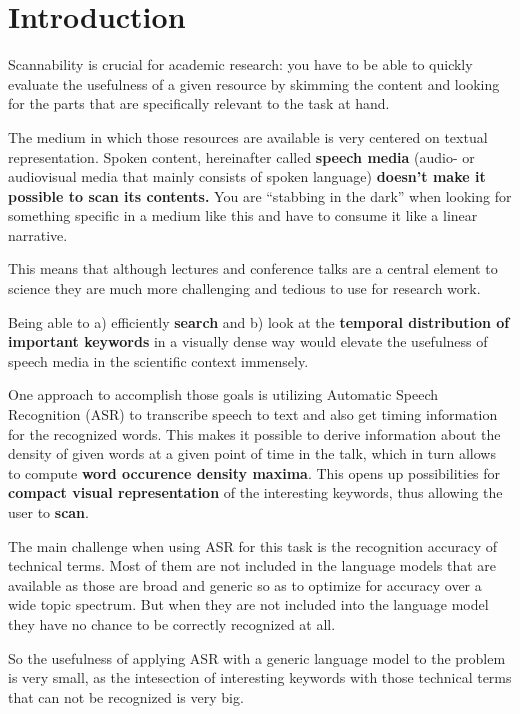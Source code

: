 \section{Introduction}\label{introduction}

Scannability is crucial for academic research: you have to be able to
quickly evaluate the usefulness of a given resource by skimming the
content and looking for the parts that are specifically relevant to the
task at hand.

The medium in which those resources are available is very centered on
textual representation. Spoken content, hereinafter called
\textbf{speech media} (audio- or audiovisual media that mainly consists
of spoken language) \textbf{doesn't make it possible to scan its
contents.} You are ``stabbing in the dark'' when looking for something
specific in a medium like this and have to consume it like a linear
narrative.

This means that although lectures and conference talks are a central
element to science they are much more challenging and tedious to use for
research work.

Being able to a) efficiently \textbf{search} and b) look at the
\textbf{temporal distribution of important keywords} in a visually dense
way would elevate the usefulness of speech media in the scientific
context immensely.

One approach to accomplish those goals is utilizing Automatic Speech
Recognition (ASR) to transcribe speech to text and also get timing
information for the recognized words. This makes it possible to derive
information about the density of given words at a given point of time in
the talk, which in turn allows to compute \textbf{word occurence density
maxima}. This opens up possibilities for \textbf{compact visual
representation} of the interesting keywords, thus allowing the user to
\textbf{scan}.

The main challenge when using ASR for this task is the recognition
accuracy of technical terms. Most of them are not included in the
language models that are available as those are broad and generic so as
to optimize for accuracy over a wide topic spectrum. But when they are
not included into the language model they have no chance to be correctly
recognized at all.

So the usefulness of applying ASR with a generic language model to the
problem is very small, as the intesection of interesting keywords with
those technical terms that can not be recognized is very big.

